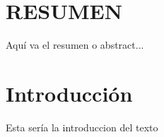 \section*{RESUMEN}


Aquí va el resumen o abstract...

\clearpage

\section{Introducción} 
Esta sería la introduccion del texto

\

\clearpage